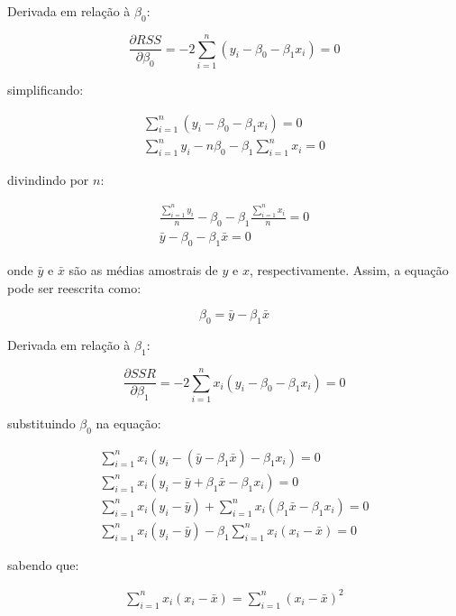 Derivada em relação à $\beta_0$:

\begin{equation}
	\frac{\partial RSS}{\partial \beta_0} = -2 \sum_{i=1}^n (y_i - \beta_0 - \beta_1 x_i) = 0
\end{equation}

simplificando:

\begin{gather*}
	\sum_{i=1}^n (y_i - \beta_0 - \beta_1 x_i) = 0 \\
	\sum_{i=1}^n y_i - n \beta_0 - \beta_1 \sum_{i=1}^n x_i = 0
\end{gather*}

divindindo por $n$:

\begin{gather*}
	\frac{\sum_{i=1}^n y_i}{n} - \beta_0 - \beta_1 \frac{\sum_{i=1}^n x_i}{n} = 0 \\
	\bar{y} - \beta_0 - \beta_1 \bar{x} = 0
\end{gather*}

onde $\bar{y}$ e $\bar{x}$ são as médias amostrais de $y$ e $x$, respectivamente. Assim, a equação pode ser reescrita como:

\begin{equation}
	\beta_0 = \bar{y} - \beta_1 \bar{x}
	\label{eq:beta0}
\end{equation}

Derivada em relação à $\beta_1$:

\begin{equation}
	\frac{\partial SSR}{\partial \beta_1} = -2 \sum_{i=1}^n x_i (y_i - \beta_0 - \beta_1 x_i) = 0
\end{equation}

substituindo $\beta_0$ na equação:


\begin{gather*}
	\sum_{i=1}^n x_i (y_i - (\bar{y} - \beta_1 \bar{x}) - \beta_1 x_i) = 0 \\
	\sum_{i=1}^n x_i (y_i - \bar{y} + \beta_1 \bar{x} - \beta_1 x_i) = 0 \\
	\sum_{i=1}^n x_i (y_i - \bar{y}) + \sum_{i=1}^n x_i (\beta_1 \bar{x} - \beta_1 x_i) = 0 \\
	\sum_{i=1}^n x_i (y_i - \bar{y}) - \beta_1 \sum_{i=1}^n x_i (x_i - \bar{x}) = 0
\end{gather*}

sabendo que:

\begin{gather*}
	\sum_{i=1}^n x_i (x_i - \bar{x}) = \sum_{i=1}^n (x_i - \bar{x})^2
\end{gather*}

